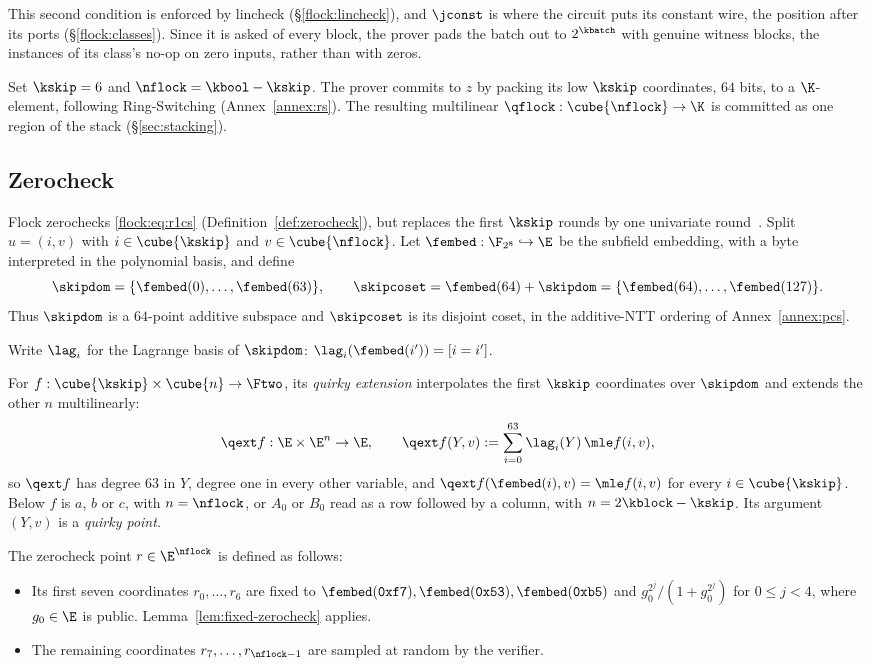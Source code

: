 This second condition is enforced by lincheck (\S\ref{flock:lincheck}), and $\jconst$ is where the circuit puts its constant wire, the position after its ports (\S\ref{flock:classes}). Since it is asked of every block, the prover pads the batch out to $2^{\kbatch}$ with genuine witness blocks, the instances of its class's no-op on zero inputs, rather than with zeros.

Set $\kskip=6$ and $\nflock=\kbool-\kskip$. The prover commits to $z$ by packing its low $\kskip$ coordinates, $64$ bits, to a $\K$-element, following Ring-Switching (Annex~\ref{annex:rs}). The resulting multilinear $\qflock:\cube{\nflock}\to\K$ is committed as one region of the stack (\S\ref{sec:stacking}).


\subsection{Zerocheck}\label{flock:zerocheck}

Flock zerochecks \eqref{flock:eq:r1cs} (Definition~\ref{def:zerocheck}), but replaces the first $\kskip$ rounds by one univariate round~\cite{Gru24}. Split $u=(i,v)$ with $i\in\cube{\kskip}$ and $v\in\cube{\nflock}$. Let $\fembed:\F_{2^8}\hookrightarrow\E$ be the subfield embedding, with a byte interpreted in the polynomial basis, and define
\[
\skipdom=\{\fembed(0),\ldots,\fembed(63)\},\qquad \skipcoset=\fembed(64)+\skipdom=\{\fembed(64),\ldots,\fembed(127)\}.
\]
Thus $\skipdom$ is a $64$-point additive subspace and $\skipcoset$ is its disjoint coset, in the additive-NTT ordering of Annex~\ref{annex:pcs}.

Write $\lag_i$ for the Lagrange basis of $\skipdom$: $\lag_i(\fembed(i'))=[i=i']$.

\begin{definition}\label{def:quirky}
For $f:\cube{\kskip}\times\cube{n}\to\Ftwo$, its \emph{quirky extension} interpolates the first $\kskip$ coordinates over $\skipdom$ and extends the other $n$ multilinearly:
\[
  \qext f:\E\times\E^{n}\to\E,\qquad
  \qext f(Y,v):=\sum_{i=0}^{63}\lag_i(Y)\,\mle f(i,v),
\]
so $\qext f$ has degree $63$ in $Y$, degree one in every other variable, and $\qext f(\fembed(i),v)=\mle f(i,v)$ for every $i\in\cube{\kskip}$. Below $f$ is $a$, $b$ or $c$, with $n=\nflock$, or $A_0$ or $B_0$ read as a row followed by a column, with $n=2\kblock-\kskip$. Its argument $(Y,v)$ is a \emph{quirky point}.
\end{definition}

The zerocheck point $r \in \E^{\nflock}$ is defined as follows:
\begin{itemize}
  \item Its first seven coordinates $r_0, \dots, r_6$ are fixed to $\fembed(\mathtt{0xf7}),\fembed(\mathtt{0x53}),\fembed(\mathtt{0xb5})$ and $g_0^{2^j}/(1+g_0^{2^j})$ for $0\leq j<4$, where $g_0\in\E$ is public. Lemma~\ref{lem:fixed-zerocheck} applies.
  \item The remaining coordinates $r_7,\dots,r_{\nflock-1}$ are sampled at random by the verifier.
\end{itemize}

